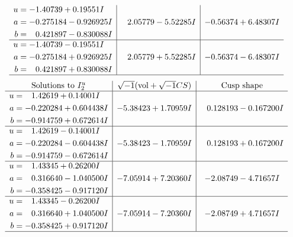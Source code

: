 \documentclass[1p]{elsarticle_modified}
\theoremstyle{definition}
\newcommand{\I}{\sqrt{-1}}
\begin{document}
$$\begin{array}{c|c|c}
\begin{aligned}
u &= -1.40739 + 0.19551 I \\
a &= -0.275184 - 0.926925 I \\
b &= \phantom{-}0.421897 - 0.830088 I\end{aligned}
 & \phantom{-}2.05779 - 5.52285 I & -0.56374 + 6.48307 I \\ \hline\begin{aligned}
u &= -1.40739 - 0.19551 I \\
a &= -0.275184 + 0.926925 I \\
b &= \phantom{-}0.421897 + 0.830088 I\end{aligned}
 & \phantom{-}2.05779 + 5.52285 I & -0.56374 - 6.48307 I\\
 \hline 
 \end{array}$$\newpage$$\begin{array}{c|c|c}  
\text{Solutions to }I^u_{2}& \I (\text{vol} + \sqrt{-1}CS) & \text{Cusp shape}\\
 \hline 
\begin{aligned}
u &= \phantom{-}1.42619 + 0.14001 I \\
a &= -0.220284 + 0.604438 I \\
b &= -0.914759 + 0.672614 I\end{aligned}
 & -5.38423 + 1.70959 I & \phantom{-}0.128193 - 0.167200 I \\ \hline\begin{aligned}
u &= \phantom{-}1.42619 - 0.14001 I \\
a &= -0.220284 - 0.604438 I \\
b &= -0.914759 - 0.672614 I\end{aligned}
 & -5.38423 - 1.70959 I & \phantom{-}0.128193 + 0.167200 I \\ \hline\begin{aligned}
u &= \phantom{-}1.43345 + 0.26200 I \\
a &= \phantom{-}0.316640 - 1.040500 I \\
b &= -0.358425 - 0.917120 I\end{aligned}
 & -7.05914 + 7.20360 I & -2.08749 - 4.71657 I \\ \hline\begin{aligned}
u &= \phantom{-}1.43345 - 0.26200 I \\
a &= \phantom{-}0.316640 + 1.040500 I \\
b &= -0.358425 + 0.917120 I\end{aligned}
 & -7.05914 - 7.20360 I & -2.08749 + 4.71657 I\\
 \hline 
 \end{array}$$\newpage\newpage\renewcommand{\arraystretch}{1}
\end{document}
